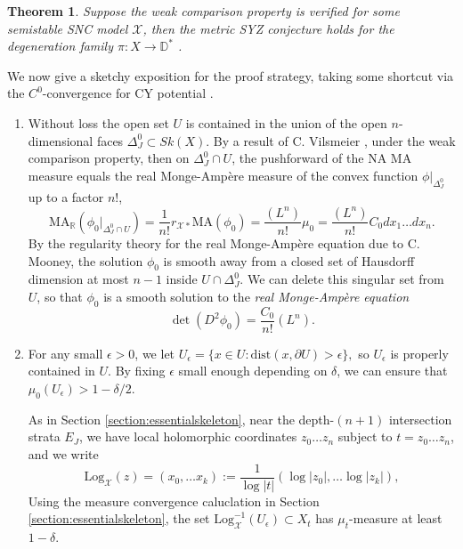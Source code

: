 \documentclass[a4paper]{article}
\newtheorem{thm}{Theorem}[section]
\theoremstyle{definition}
\newcommand{\R}{\mathbb{R}}
\begin{document}
\begin{thm}\cite{LiNA}
	Suppose the weak comparison property is verified for some semistable SNC model $\mathcal{X}$, then the metric SYZ conjecture holds for the degeneration family $\pi: X\to \mathbb{D}^*$ . 
\end{thm}


We now give a sketchy exposition for the proof strategy, taking some shortcut via the $C^0$-convergence for CY potential \cite[Thm. 1.2]{Litheta}. 



\begin{enumerate}
	\item  Without loss the open set $U$ is contained in the union of the open $n$-dimensional faces $\Delta_J^0\subset Sk(X)$.   By a result of C. Vilsmeier \cite{Vilsmeier}, under the weak comparison property, then on $\Delta_J^0\cap U$, the pushforward of the NA MA measure equals the real Monge-Amp\`ere measure of the convex function $\phi|_{\Delta_J^0}$ up to a factor $n!$,
	\[
 \text{MA}_\R (\phi_0 |_{\Delta_J^0 \cap U} )  =\frac{1}{n!}	r_{\mathcal{X}* } \text{MA}( \phi_0 )= \frac{(L^n)}{n!}\mu_0  = \frac{(L^n)}{n!} C_0 dx_1\ldots dx_n.
	\]
	By the regularity theory for the real Monge-Amp\`ere equation due to C. Mooney, the solution $\phi_0$ is smooth away from a closed set of Hausdorff dimension at most $n-1$ inside $U\cap \Delta_J^0$. We can delete this singular set from $U$, so that 
	 $\phi_0$ is a smooth solution to the \emph{real Monge-Amp\`ere equation} 
	\begin{equation}
   \det(D^2 \phi_0)=  \frac{C_0}{n!} (L^n).
	\end{equation}
	
	

	
	
	\item  For any small $\epsilon>0$, we let 
$
	U_\epsilon =\{     x\in U: \text{dist}( x, \partial U )>\epsilon      \}, 
$
so $U_\epsilon$ is properly contained in $U$. 
	By fixing $\epsilon$ small enough depending on $\delta$, we can ensure that $\mu_0(U_\epsilon) > 1-\delta/2$. 
	
	
	As in Section \ref{section:essentialskeleton}, near the depth-$(n+1)$ intersection strata $E_J$, we have local holomorphic coordinates $z_0\ldots z_n$ subject to $t=z_0\ldots z_n$, and we write 
	\[
		\text{Log}_{\mathcal{X}} (z)=(x_0,\ldots x_k):=  \frac{1}{\log |t|}(   \log |z_0|, \ldots \log |z_k|      ),
	\]
Using the measure convergence caluclation in Section \ref{section:essentialskeleton}, the set $\text{Log}_\mathcal{X}^{-1} (U_\epsilon)\subset X_t$ has $\mu_t$-measure at least $1-\delta$. 
	

\end{enumerate}
\end{document}
